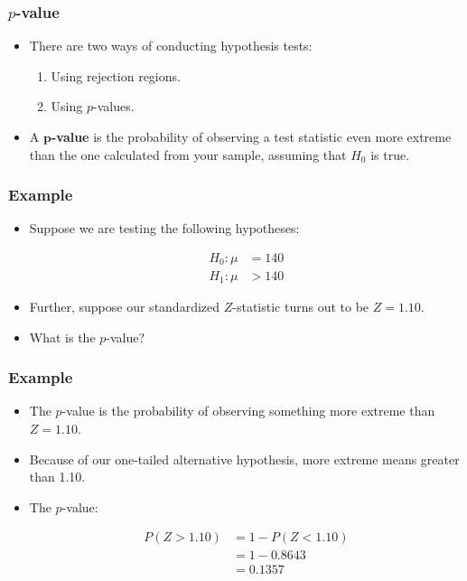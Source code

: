 \documentclass[12pt]{beamer}
\begin{document}
\begin{frame}
	\frametitle{$p$-value}
	
	\begin{itemize}[label={\color{blue}$\blacktriangleright$}]
		\item There are two ways of conducting hypothesis tests:
		\begin{enumerate}[label=\arabic*.]
			\item Using rejection regions.
			\item Using $p$-values.
		\end{enumerate}
		
		\item A \textbf{$\boldsymbol{p}$-value} is the probability of observing a test statistic even more extreme than the one calculated from your sample, assuming that $H_0$ is true.
	\end{itemize}
	
\end{frame}
\begin{frame}
	\frametitle{Example}
	
	\begin{itemize}[label={\color{blue}$\blacktriangleright$}]
		\item Suppose we are testing the following hypotheses:
		
		\begin{align*}
			H_0 : \mu &= 140 \\
			H_1 : \mu &> 140
		\end{align*}
		
		\item Further, suppose our standardized $Z$-statistic turns out to be $Z = 1.10$.
		
		\item What is the $p$-value?
	\end{itemize}
	
\end{frame}

\begin{frame}
	\frametitle{Example}
	
	\begin{itemize}[label={\color{blue}$\blacktriangleright$}]
		\item The $p$-value is the probability of observing something more extreme than $Z = 1.10$.
		
		\item Because of our one-tailed alternative hypothesis, more extreme means greater than 1.10.
		
		\item The $p$-value:
		
		\begin{align*}
			P(Z > 1.10) &= 1 - P(Z < 1.10) \\
			&= 1 - 0.8643 \\
			&= 0.1357
		\end{align*}
	\end{itemize}
	
\end{frame}
\end{document}
